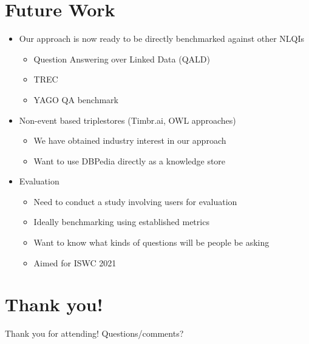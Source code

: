 \documentclass[logoontitle,tabu,supertabular,aspectratio=43]{preney-uwindsor-beamer}
\begin{document}
	\section{Future Work}
	\begin{frame}{\insertsection}
		\begin{itemize}
            \item Our approach is now ready to be directly benchmarked against other NLQIs
            \begin{itemize}
                \item Question Answering over Linked Data (QALD)
                \item TREC %
                \item YAGO QA benchmark
            \end{itemize}
            \item Non-event based triplestores (Timbr.ai, OWL approaches)
            \begin{itemize}
                \item We have obtained industry interest in our approach
                \item Want to use DBPedia directly as a knowledge store
            \end{itemize}
            \item Evaluation
            \begin{itemize}
                \item Need to conduct a study involving users for evaluation
                \item Ideally benchmarking using established metrics
                \item Want to know what kinds of questions will be people be asking
                \item Aimed for ISWC 2021
            \end{itemize}
		\end{itemize}
	\end{frame}


	\section*{Thank you!}
	\begin{frame}
		\begin{center}
			\huge Thank you for attending!  Questions/comments?
		\end{center}
	\end{frame}
\end{document}
